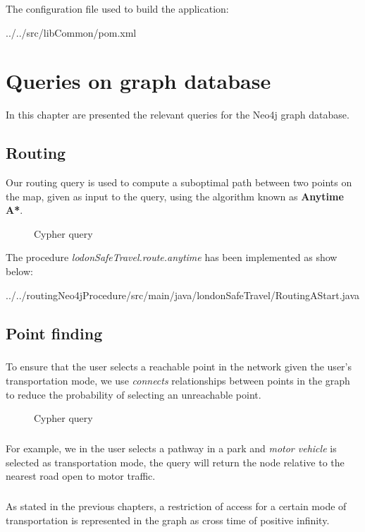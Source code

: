 The configuration file used to build the application:


{../../src/libCommon/pom.xml}

\chapter{Queries on graph database}

In this chapter are presented the relevant queries for the
Neo4j graph database.

\section{Routing}

Our routing query is used to compute a suboptimal path between two points on the map, given as input to the query, using the algorithm known as \textbf{Anytime A*}.

\begin{figure}[H]
	
	\caption{Cypher query}
\end{figure} 

The procedure \textit{lodonSafeTravel.route.anytime} has been implemented as show below:


	{../../routingNeo4jProcedure/src/main/java/londonSafeTravel/RoutingAStart.java}

\section{Point finding}

\paragraph{}
To ensure that the user selects a reachable point in the network given the user's transportation mode, we use \textit{connects} relationships between points in the graph to reduce the probability of selecting an unreachable point.

\begin{figure}[H]
	
	\caption{Cypher query}
\end{figure} 

\paragraph{}
For example, we in the user selects a pathway in a park and \textit{motor vehicle} is selected as transportation mode, the query will return the node relative to the nearest road open to motor traffic.

\paragraph{}
As stated in the previous chapters, a restriction of access for a certain mode of transportation is represented in the graph as cross time of positive infinity.
